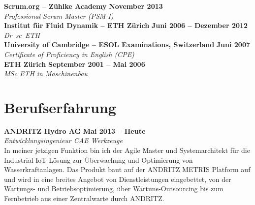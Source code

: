 \documentclass[line,11pt,a4paper]{../resume}
\begin{document}
\begin{resume}
\textbf{Scrum.org -- Z\"uhlke Academy} \hfill \textbf{November 2013}%
\vspace{2mm}\\\vspace{1mm}%
\textsl{Professional Scrum Master (PSM I)}%
\vspace{2mm}\\\vspace{-1mm}%
%
\textbf{Institut f\"ur Fluid Dynamik -- ETH Z\"urich} \hfill \textbf{Juni 2006 -- Dezember 2012}%
\vspace{2mm}\\\vspace{1mm}%
\textsl{Dr\ sc\ ETH}%
\vspace{2mm}\\\vspace{-1mm}%
%
\textbf{University of Cambridge -- ESOL Examinations, Switzerland} \hfill \textbf{Juni 2007}%
\vspace{2mm}\\\vspace{1mm}%
\textsl{Certificate of Proficiency in English (CPE)}%
\vspace{2mm}\\\vspace{-1mm}%
%
\textbf{ETH Z\"urich} \hfill \textbf{September 2001 -- Mai 2006}%
\vspace{2mm}\\\vspace{1mm}%
\textsl{MSc ETH in Maschinenbau}%
\vspace{-3mm}\\\vspace{-1mm}%

\section{\mysidestyle Berufserfahrung}\vspace{2mm}

\textbf{ANDRITZ Hydro AG} \hfill \textbf{Mai 2013 -- Heute}
\vspace{2mm}\\\vspace{1mm}%
\textsl{Entwicklungsingenieur CAE Werkzeuge}\\
In meiner jetzigen Funktion bin ich der Agile Master und Systemarchitekt f\"ur
die Industrial IoT L\"osung zur \"Uberwachung und Optimierung von
Wasserkraftanlagen. Das Produkt baut auf der ANDRITZ METRIS Platform auf und
wird in eine breites Angebot von Dienstleistungen eingebettet, von der
Wartungs- und Betriebsoptimierung, \"uber Wartuns-Outsourcing bis zum
Fernbetrieb aus einer Zentralwarte durch ANDRITZ.


\end{resume}
\end{document}
